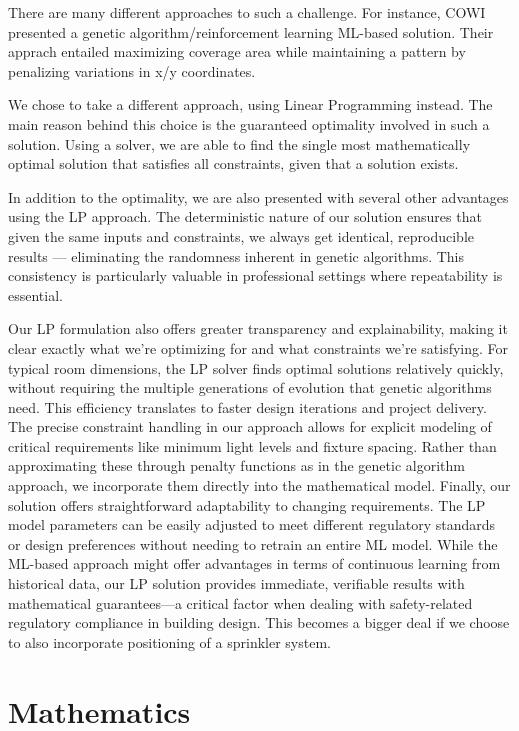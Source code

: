 \documentclass{article}
\begin{document}
There are many different approaches to such a challenge. For instance, COWI presented
a genetic algorithm/reinforcement learning ML-based solution. Their apprach 
entailed maximizing coverage area while maintaining a pattern by penalizing variations
in x/y coordinates. 

We chose to take a different approach, using Linear Programming instead. The main reason
behind this choice is the guaranteed optimality involved in such a solution.
Using a solver, we are able to find the single most mathematically optimal solution 
that satisfies all constraints, given that a solution exists.

In addition to the optimality, we are also presented with several other advantages 
using the LP approach. The deterministic nature of our solution ensures that given 
the same inputs and constraints, we always get identical, reproducible 
results — eliminating the randomness inherent in genetic algorithms. This 
consistency is particularly valuable in professional settings where repeatability 
is essential.

Our LP formulation also offers greater transparency and explainability, making it 
clear exactly what we're optimizing for and what constraints we're satisfying. 
For typical room dimensions, the LP solver finds optimal solutions relatively quickly, 
without requiring the multiple generations of evolution that genetic algorithms need. 
This efficiency translates to faster design iterations and project delivery.
The precise constraint handling in our approach allows for explicit modeling of 
critical requirements like minimum light levels and fixture spacing. Rather than 
approximating these through penalty functions as in the genetic algorithm approach, 
we incorporate them directly into the mathematical model.
Finally, our solution offers straightforward adaptability to changing requirements. 
The LP model parameters can be easily adjusted to meet different regulatory 
standards or design preferences without needing to retrain an entire ML model. 
While the ML-based approach might offer advantages in terms of continuous 
learning from historical data, our LP solution provides immediate, verifiable 
results with mathematical guarantees—a critical factor when dealing with 
safety-related regulatory compliance in building design. This becomes a bigger deal
if we choose to also incorporate positioning of a sprinkler system.

\newpage

\section{Mathematics}
\end{document}
